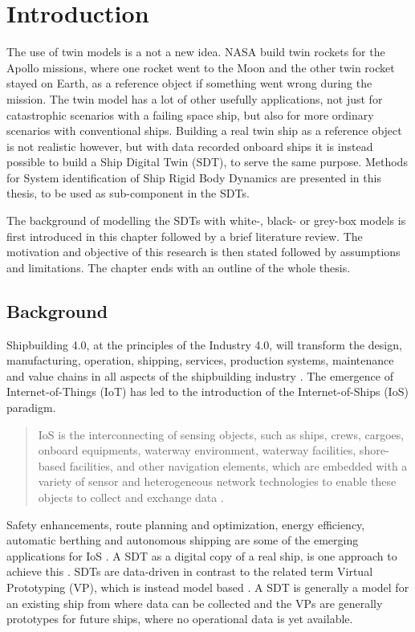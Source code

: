 \chapter{Introduction}
The use of twin models is a not a new idea. NASA build twin rockets for the Apollo missions, where one rocket went to the Moon and the other twin rocket stayed on Earth, as a reference object if something went wrong during the mission.  
The twin model has a lot of other usefully applications, not just for catastrophic scenarios with a failing space ship, but also for more ordinary scenarios with conventional ships. Building a real twin ship as a reference object is not realistic however, but with data recorded onboard ships it is instead possible to build a Ship Digital Twin (SDT), to serve the same purpose.
Methods for System identification of Ship Rigid Body Dynamics are presented in this thesis, to be used as sub-component in the SDTs. 

The background of modelling the SDTs with white-, black- or grey-box models is first introduced in this chapter followed by a brief literature review. The motivation and objective of this research is then stated followed by assumptions and limitations. The chapter ends with an outline of the whole thesis.

\section{Background}
Shipbuilding 4.0, at the principles of the Industry 4.0, will transform the design, manufacturing, operation, shipping, services, production systems, maintenance and value chains in all aspects of the shipbuilding 
industry \cite{stanic_toward_2018}.
The emergence of Internet-of-Things (IoT) has led to the introduction of the Internet-of-Ships (IoS) paradigm. \begin{quote} IoS is the interconnecting of sensing objects, such as ships, crews, cargoes, onboard equipments, waterway environment, waterway facilities, shore-based facilities, and other navigation elements, which are embedded with a variety of sensor and heterogeneous network technologies to enable these objects to collect and exchange data \cite{liu_internet_2016-1}.\end{quote}
Safety enhancements, route planning and optimization, energy efficiency, automatic berthing and autonomous shipping are some of the emerging applications for IoS \cite{aslam_internet_2020}.
A SDT as a digital copy of a real ship, is one approach to achieve this \cite{chen_review_2021}. 
SDTs are data-driven in contrast to the related term Virtual Prototyping (VP), which is instead model based \cite{major_framework_2021}. A SDT is generally a model for an existing ship from where data can be collected and the VPs are generally prototypes for future ships, where no operational data is yet available.

